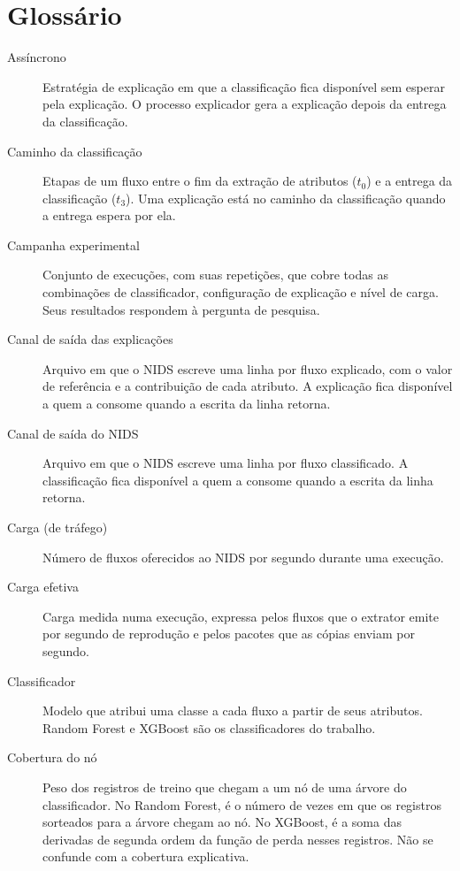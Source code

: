 \documentclass[
  12pt,
  oneside,
  a4paper,
  chapter=TITLE,
  sumario=tradicional,
  english,
  brazil
]{abntex2}
\begin{document}
\chapter*{Glossário}
{}
\begin{description}
  \item[Assíncrono]\label{gl:assincrono} Estratégia de explicação em que a classificação fica disponível sem esperar pela explicação. O processo explicador gera a explicação depois da entrega da classificação.
  \item[Caminho da classificação]\label{gl:caminho} Etapas de um fluxo entre o fim da extração de atributos ($t_0$) e a entrega da classificação ($t_3$). Uma explicação está no caminho da classificação quando a entrega espera por ela.
  \item[Campanha experimental]\label{gl:campanha} Conjunto de execuções, com suas repetições, que cobre todas as combinações de classificador, configuração de explicação e nível de carga. Seus resultados respondem à pergunta de pesquisa.
  \item[Canal de saída das explicações]\label{gl:canal-explicacoes} Arquivo em que o NIDS escreve uma linha por fluxo explicado, com o valor de referência e a contribuição de cada atributo. A explicação fica disponível a quem a consome quando a escrita da linha retorna.
  \item[Canal de saída do NIDS]\label{gl:canal-nids} Arquivo em que o NIDS escreve uma linha por fluxo classificado. A classificação fica disponível a quem a consome quando a escrita da linha retorna.
  \item[Carga (de tráfego)]\label{gl:carga} Número de fluxos oferecidos ao NIDS por segundo durante uma execução.
  \item[Carga efetiva]\label{gl:carga-efetiva} Carga medida numa execução, expressa pelos fluxos que o extrator emite por segundo de reprodução e pelos pacotes que as cópias enviam por segundo.
  \item[Classificador]\label{gl:classificador} Modelo que atribui uma classe a cada fluxo a partir de seus atributos. Random Forest e XGBoost são os classificadores do trabalho.
  \item[Cobertura do nó]\label{gl:cobertura-no} Peso dos registros de treino que chegam a um nó de uma árvore do classificador. No Random Forest, é o número de vezes em que os registros sorteados para a árvore chegam ao nó. No XGBoost, é a soma das derivadas de segunda ordem da função de perda nesses registros. Não se confunde com a cobertura explicativa.

\end{description}
\end{document}
